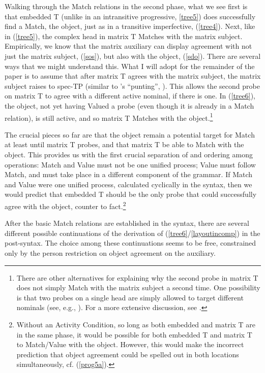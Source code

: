 \documentclass[output=paper
,modfonts
,nonflat]{langsci/langscibook}
\begin{document}
\noindent Walking through the Match relations in the second phase, what we see first is that embedded T (unlike in an intransitive progressive, \ref{tree5}) does successfully find a Match, the object, just as in a transitive imperfective, (\ref{tree4}). Next, like in (\ref{tree5}), the complex head in matrix T Matches with the matrix subject. Empirically, we know that the matrix auxiliary can display agreement with not just the matrix subject, (\ref{sos}), but also with the object, (\ref{sdo}). There are several ways that we might understand this. What I will adopt for the remainder of the paper is to assume that after matrix T agrees with the matrix subject, the matrix subject raises to spec-TP (similar to \citeauthor{AnandNevins06}'s ``punting'', \citeyear{AnandNevins06}). This allows the second probe on matrix T to agree with a different active nominal, if there is one. In (\ref{tree6}), the object, not yet having Valued a probe (even though it is already in a Match relation), is still active, and so matrix T Matches with the object.\footnote{There are other alternatives for explaining why the second probe in matrix T does not simply Match with the matrix subject a second time. One possibility is that two probes on a single head are simply allowed to target different nominals (see, e.g., \citealt{Keine10}). For a more extensive discussion, see \citet[fn. 12]{Georgi12}.}\largerpage[-2]

The crucial pieces so far are that the object remain a potential target for Match at least until matrix T probes, and that matrix T be able to Match with the object. This provides us with the first crucial separation of and ordering among operations: Match and Value must not be one unified process; Value must follow Match, and must take place in a different component of the grammar. If Match and Value were one unified process, calculated cyclically in the syntax, then we would predict that embedded T should be the only probe that could successfully agree with the object, counter to fact.\footnote{Without an Activity Condition, so long as both embedded and matrix T are in the same phase, it would be possible for both embedded T and matrix T to Match/Value with the object. However, this would make the incorrect prediction that object agreement could be spelled out in both locations simultaneously, cf. (\ref{prog5a}).}  

After the basic Match relations are established in the syntax, there are several different possible continuations of the derivation of (\ref{tree6}/\ref{layoutincomp}) in the post-syntax. The choice among these continuations seems to be free, constrained only by the person restriction on object agreement on the auxiliary. 
\end{document}
